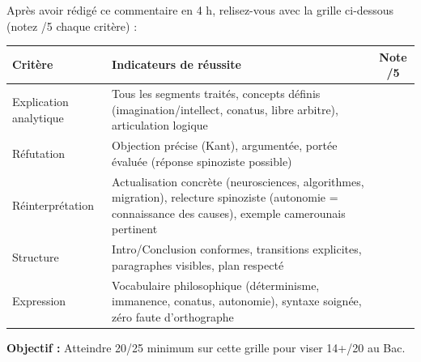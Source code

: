 \documentclass[11pt]{article}
\begin{document}
\begin{corrige}
Après avoir rédigé ce commentaire en 4 h, relisez-vous avec la grille ci-dessous (notez /5 chaque critère) :
\begin{center}
\begin{tabularx}{\linewidth}{|l|X|c|}
\hline
\rowcolor{popblueL}
\textbf{Critère} & \textbf{Indicateurs de réussite} & \textbf{Note /5} \\
\hline
Explication analytique & Tous les segments traités, concepts définis (imagination/intellect, conatus, libre arbitre), articulation logique & \\
\hline
Réfutation & Objection précise (Kant), argumentée, portée évaluée (réponse spinoziste possible) & \\
\hline
Réinterprétation & Actualisation concrète (neurosciences, algorithmes, migration), relecture spinoziste (autonomie = connaissance des causes), exemple camerounais pertinent & \\
\hline
Structure & Intro/Conclusion conformes, transitions explicites, paragraphes visibles, plan respecté & \\
\hline
Expression & Vocabulaire philosophique (déterminisme, immanence, conatus, autonomie), syntaxe soignée, zéro faute d'orthographe & \\
\hline
\end{tabularx}
\end{center}
\textbf{Objectif :} Atteindre 20/25 minimum sur cette grille pour viser 14+/20 au Bac.
\end{corrige}
\end{document}
